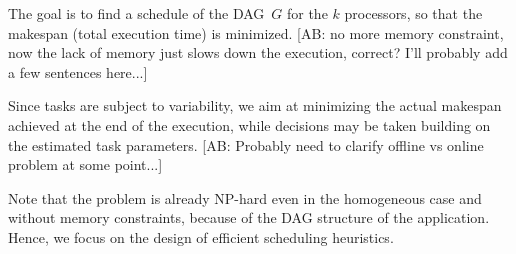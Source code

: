 \documentclass[conference]{IEEEtran}
\newcommand{\skug}[1]{{\color{blue}[SK: #1]}}
\newcommand{\hmey}[1]{{\color{red}[HM: #1]}}
\newcommand{\AB}[1]{{\color{purple}[AB: #1]}}
\begin{document}
The goal is to find a schedule of the DAG~$G$ for the $k$ processors,
so that the makespan (total execution time) is minimized. 
\AB{no more memory constraint, now the lack of memory just slows down the execution, correct?
I'll probably add a few sentences here...}

Since tasks are subject to variability, we aim at minimizing the actual makespan
achieved at the end of the execution, while decisions may be taken building
on the estimated task parameters.
\AB{Probably need to clarify offline vs online problem at some point...}

Note that the problem is already NP-hard even in the homogeneous case and 
without memory constraints, because of the DAG structure of the application. 
Hence, we focus on the design of efficient scheduling heuristics. 
\end{document}
